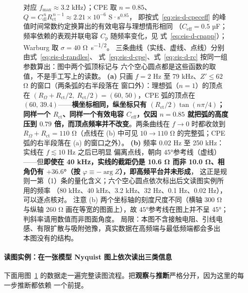 \begin{figure}[tbp]
{对应 $f_{\max}\approx3.2$ kHz）；CPE 取 $n=0.85$、
$Q=C_{\mathrm{dl}}^{\,n}R_{\mathrm{ct}}^{\,n-1}\approx2.21\times10^{-6}$ S·s$^{0.85}$，
即按式~\eqref{eq:eis-d-cpeceff} 的峰值时间常数约定换算出的有效电容与理想情形相同
（$C_{\mathrm{eff}}=0.5$ µF；频率依赖的表观并联电容 $C_{\mathrm{p}}$ 随频率变化，见
式~\eqref{eq:eis-d-cpapp}）；Warburg 取 $\sigma=40$ \unit{\ohm.s^{-1/2}}。
三条曲线（实线、虚线、点线）分别由式~\eqref{eq:eis-d-randles}、
式~\eqref{eq:eis-d-cpe}、式~\eqref{eq:eis-d-rc} 按同一组参数算出：图中两个弧顶标记与
六个空心圆点都是这些函数的取值，不是手工写上的读数。
\textbf{(a)} 只画 $f=2$ Hz 至 79 kHz、$Z'\le62$ \unit{\ohm} 的窗口（两条弧的右半段落在
窗口外）：理想弧（$n=1$）的顶点在
$(R_{\Omega}+R_{\mathrm{ct}}/2,\;R_{\mathrm{ct}}/2)=(60,\,50)$，CPE 弧的顶点在
$(60,\,39.4)$——\textbf{横坐标相同，纵坐标只有 $(R_{\mathrm{ct}}/2)\tan(n\pi/4)$；
同样一个 $R_{\mathrm{ct}}$、同样一个有效电容 $C_{\mathrm{eff}}$，仅因 $n=0.85$ 就把弧的高度压到
$0.79$ 倍，而顶点频率并不改变}。两条曲线在 $f\to0$ 时都收敛到
$R_{\Omega}+R_{\mathrm{ct}}=110$ \unit{\ohm}（点线在 (b) 中可见 $10\to110$ \unit{\ohm}
的完整弧；CPE 弧的右半段落在 (a) 的窗口之外）。
\textbf{(b)} 频率 0.02 Hz 至 250 kHz：实线在 $f\lesssim 10$ Hz 之后已明显
偏离点线，朝向 $45$°参考线（虚线）——但\textbf{即使在 40 kHz，实线的截距仍是
10.6 \unit{\ohm} 而非 10.0 \unit{\ohm}、相角仍有 $+36.6$°（按 $\varphi\equiv-\arg Z$），即高频平台并未形成}，
这正是规则一第（1）条的量化含义；六个空心圆点依次标出后文读图实例所用的频率
（80 kHz、40 kHz、3.2 kHz、32 Hz、0.1 Hz、0.02 Hz），可以逐点核对。
注意 (b) 两个坐标轴的刻度尺度不同（横轴 300 \unit{\ohm} 与纵轴 260 \unit{\ohm}
画在等宽的图面上），故 $45$°参考线在图上并不呈 $45$°；判斜率请用数值而非图面角度。
局限：本图不含接触电阻、引线电感、有限扩散与吸附弛豫，真实数据在高频端与最低频端都会多出
本图没有的结构。
\modelmark{}
}
\label{fig:eis-d-model}
\end{figure}

\paragraph{读图实例：在一张模型 Nyquist 图上依次读出三类信息} 下面用图~\ref{fig:eis-d-model}
的数据走一遍完整读图流程。把\textbf{观察}与\textbf{推断}严格分开，因为这里的每一步推断都依赖
一个前提。

